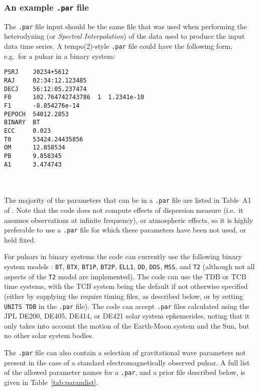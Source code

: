 \subsubsection{An example {\tt .par} file}\label{sec:parfile}

The {\tt .par} file input should be the same file that was used when performing the heterodyning (or {\it Spectral Interpolation})
of the data used to produce the input data time series. A {\sc tempo(2)}-style {\tt .par} file could have the following form, e.g.\
for a pulsar in a binary system:
\newsavebox{\Lst}
\begin{lrbox}{\Lst}
\begin{lstlisting}
PSRJ    J0234+5612
RAJ     02:34:12.123485
DECJ    56:12:05.237474
F0      102.764742743786  1  1.2341e-10
F1      -8.854276e-14
PEPOCH  54012.2853
BINARY  BT
ECC     0.023
T0      53424.24435856
OM      12.858534
PB      9.858345
A1      3.474743
\end{lstlisting}
\end{lrbox}
\\[5pt] \indent \fbox{\usebox{\Lst}} \\[5pt]

The majority of the parameters that can be in a {\tt .par} file are listed in Table~A1 of \citep{2006MNRAS.372.1549E}.
Note that the code does not compute effects of dispersion measure (i.e.\ it assumes observations at infinite frequency),
or atmospheric effects, so it is highly preferable to use a {\tt .par} file for which these parameters have been not
used, or held fixed.

For pulsars in binary systems the code can currently use the following binary system models \citep[see e.g.][for discussion
of some of the models]{1989ApJ...345..434T,2007PhRvD..76d2006P}: {\tt BT}, {\tt BTX},
{\tt BT1P}, {\tt BT2P}, {\tt ELL1}, {\tt DD}, {\tt DDS}, {\tt MSS}, and {\tt T2} (although not all aspects of the
{\tt T2} model are implemented). The code can use the TDB or TCB time systems, with the TCB system being the default if not otherwise
specified (either by supplying the require timing files, as described below, or by setting {\tt UNITS TDB} in the {\tt .par} file).
The code can accept {\tt .par} files calculated using the JPL DE200, DE405, DE414, or DE421 solar system ephemerides, noting
that it only takes into account the motion of the Earth-Moon system and the Sun, but no other solar system bodies.

The {\tt .par} file can also contain a selection of gravitational wave parameters not present in the case of a standard
electromagnetically observed pulsar. A full list of the allowed parameter names for a {\tt .par}, and a prior file described below,
is given in Table~\ref{tab:paramlist}.

